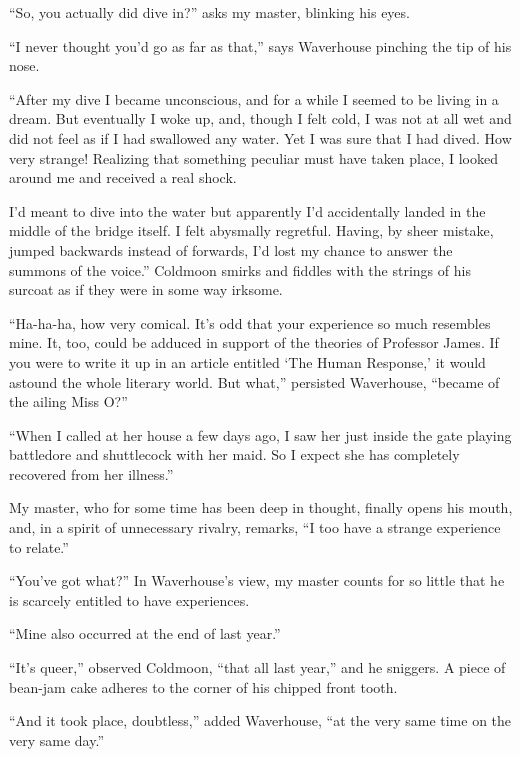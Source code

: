 \documentclass[12pt, openright]{book}
\begin{document}
``So, you actually did dive in?'' asks my master, blinking his eyes.

``I never thought you'd go as far as that,'' says Waverhouse pinching
the tip of his nose.

``After my dive I became unconscious, and for a while I seemed to be
living in a dream. But eventually I woke up, and, though I felt cold, I
was not at all wet and did not feel as if I had swallowed any water. Yet
I was sure that I had dived. How very strange! Realizing that something
peculiar must have taken place, I looked around me and received a real
shock.

I'd meant to dive into the water but apparently I'd accidentally landed
in the middle of the bridge itself. I felt abysmally regretful. Having,
by sheer mistake, jumped backwards instead of forwards, I'd lost my
chance to answer the summons of the voice.'' Coldmoon smirks and fiddles
with the strings of his surcoat as if they were in some way irksome.

``Ha-ha-ha, how very comical. It's odd that your experience so much
resembles mine. It, too, could be adduced in support of the theories of
Professor James. If you were to write it up in an article entitled `The
Human Response,' it would astound the whole literary world. But what,''
persisted Waverhouse, ``became of the ailing Miss O?''

``When I called at her house a few days ago, I saw her just inside the
gate playing battledore and shuttlecock with her maid. So I expect she
has completely recovered from her illness.''

My master, who for some time has been deep in thought, finally opens his
mouth, and, in a spirit of unnecessary rivalry, remarks, ``I too have a
strange experience to relate.''

``You've got what?'' In Waverhouse's view, my master counts for so
little that he is scarcely entitled to have experiences.

``Mine also occurred at the end of last year.''

``It's queer,'' observed Coldmoon, ``that all last year,'' and he
sniggers. A piece of bean-jam cake adheres to the corner of his chipped
front tooth.

``And it took place, doubtless,'' added Waverhouse, ``at the very same
time on the very same day.''
\end{document}
